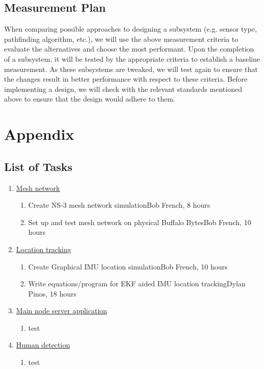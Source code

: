 \documentclass[10pt]{article}
\begin{document}
\subsection*{Measurement Plan}
When comparing possible approaches to designing a subsystem (e.g. sensor type, pathfinding algorithm, etc.), we will use the above measurement criteria to evaluate the alternatives and choose the most performant. Upon the completion of a subsystem, it will be tested by the appropriate criteria to establish a baseline measurement. As these subsystems are tweaked, we will test again to ensure that the changes result in better performance with respect to these criteria. Before implementing a design, we will check with the relevant standards mentioned above to ensure that the design would adhere to them.

\newpage\section*{Appendix}
\subsection*{List of Tasks}
\begin{enumerate}
	\item\underline{Mesh network}
	\begin{enumerate}[label=1.\arabic*]
		\item Create NS-3 mesh network simulation\hfill Bob French, 8 hours
		\item Set up and test mesh network on physical Buffalo Bytes\hfill Bob French, 10 hours
	\end{enumerate}
	\item\underline{Location tracking}
	\begin{enumerate}[label=2.\arabic*]
		\item Create Graphical IMU location simulation\hfill Bob French, 10 hours
		\item Write equations/program for EKF aided IMU location tracking\hfill Dylan Pinos, 18 hours
	\end{enumerate}
	\item\underline{Main node server application}
	\begin{enumerate}[label=3.\arabic*]
		\item test
	\end{enumerate}
	\item\underline{Human detection}
	\begin{enumerate}[label=4.\arabic*]
		\item test
	\end{enumerate}
\end{enumerate}
\end{document}
